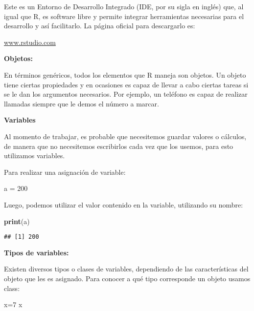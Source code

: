 \documentclass[
]{book}
\newenvironment{Shaded}{\begin{snugshade}}{\end{snugshade}}
\newcommand{\DecValTok}[1]{\textcolor[rgb]{0.00,0.00,0.81}{#1}}
\newcommand{\FunctionTok}[1]{\textcolor[rgb]{0.13,0.29,0.53}{\textbf{#1}}}
\newcommand{\NormalTok}[1]{#1}
\newcommand{\OtherTok}[1]{\textcolor[rgb]{0.56,0.35,0.01}{#1}}
\begin{document}
Este es un Entorno de Desarrollo Integrado (IDE, por su sigla en inglés)
que, al igual que R, es software libre y permite integrar herramientas
necesarias para el desarrollo y así facilitarlo. La página oficial para
descargarlo es:

\href{http://www.rstudio.com}{www.rstudio.com}

\textbf{Objetos:}

En términos genéricos, todos los elementos que R maneja son objetos. Un
objeto tiene ciertas propiedades y en ocasiones es capaz de llevar a
cabo ciertas tareas si se le dan los argumentos necesarios. Por ejemplo,
un teléfono es capaz de realizar llamadas siempre que le demos el número
a marcar.

\textbf{Variables}

Al momento de trabajar, es probable que necesitemos guardar valores o
cálculos, de manera que no necesitemos escribirlos cada vez que los
usemos, para esto utilizamos variables.

Para realizar una asignación de variable:

\begin{Shaded}
\begin{Highlighting}[]
\NormalTok{a }\OtherTok{=} \DecValTok{200}
\end{Highlighting}
\end{Shaded}

Luego, podemos utilizar el valor contenido en la variable, utilizando su
nombre:

\begin{Shaded}
\begin{Highlighting}[]
\FunctionTok{print}\NormalTok{(a)}
\end{Highlighting}
\end{Shaded}

\begin{verbatim}
## [1] 200
\end{verbatim}

\textbf{Tipos de variables:}

Existen diversos tipos o clases de variables, dependiendo de las
características del objeto que les es asignado. Para conocer a qué tipo
corresponde un objeto usamos class:

\begin{Shaded}
\begin{Highlighting}[]
\NormalTok{x}\OtherTok{=}\DecValTok{7}
\NormalTok{x}
\end{Highlighting}
\end{Shaded}
\end{document}
